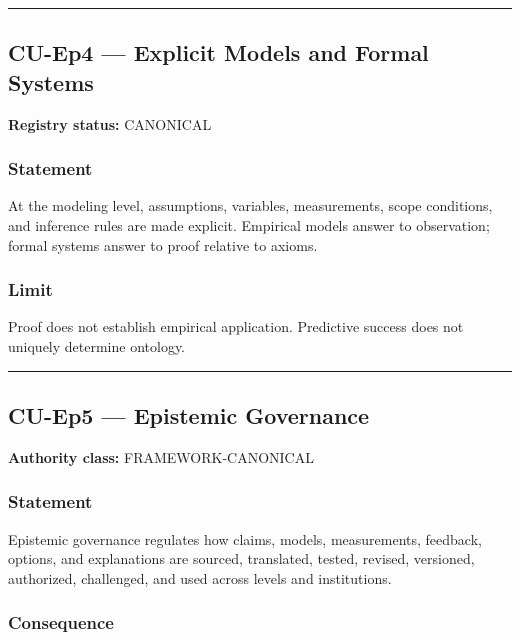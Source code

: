 \documentclass[
  11pt,
]{article}
\begin{document}
\begin{center}\rule{0.5\linewidth}{0.5pt}\end{center}

\subsection{CU-Ep4 --- Explicit Models and Formal
Systems}\label{cu-ep4-explicit-models-and-formal-systems}

\textbf{Registry status:} CANONICAL

\subsubsection{Statement}\label{statement-38}

At the modeling level, assumptions, variables, measurements, scope
conditions, and inference rules are made explicit. Empirical models
answer to observation; formal systems answer to proof relative to
axioms.

\subsubsection{Limit}\label{limit-4}

Proof does not establish empirical application. Predictive success does
not uniquely determine ontology.

\begin{center}\rule{0.5\linewidth}{0.5pt}\end{center}

\subsection{CU-Ep5 --- Epistemic
Governance}\label{cu-ep5-epistemic-governance}

\textbf{Authority class:} FRAMEWORK-CANONICAL

\subsubsection{Statement}\label{statement-39}

Epistemic governance regulates how claims, models, measurements,
feedback, options, and explanations are sourced, translated, tested,
revised, versioned, authorized, challenged, and used across levels and
institutions.

\subsubsection{Consequence}\label{consequence-5}
\end{document}
